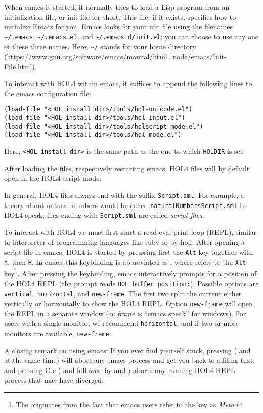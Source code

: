 When emacs is started, it normally tries to load a Lisp program from an
initialization file, or init file for short. This file, if it exists, specifies
how to initialize Emacs for you. Emacs looks for your init file using the
filenames \verb!~/.emacs!, \verb!~/.emacs.el!, and
\verb!~/.emacs.d/init.el!; you can choose to use any one of these three names.
Here, \verb!~/! stands for your home directory
(\url{https://www.gnu.org/software/emacs/manual/html_node/emacs/Init-File.html}).

To interact with HOL4 within emacs, it suffices to append the following lines to
the emacs configuration file:
\begin{lstlisting}
(load-file "<HOL install dir>/tools/hol-unicode.el")
(load-file "<HOL install dir>/tools/hol-input.el")
(load-file "<HOL install dir>/tools/holscript-mode.el")
(load-file "<HOL install dir>/tools/hol-mode.el")
\end{lstlisting}
\noindent Here, \lstinline{<HOL install dir>} is the same path as the one
to which \texttt{HOLDIR} is set.

After loading the files, respectively restarting emacs, HOL4 files will by
default open in the HOL4 script mode.

In general, HOL4 files always end with the suffix \texttt{Script.sml}.
For example, a theory about natural numbers would be called
\texttt{naturalNumbersScript.sml}
In HOL4 speak, files ending with \texttt{Script.sml} are called \emph{script files}.

To interact with HOL4 we must first start a read-eval-print loop (REPL), similar
to interpreter of programming languages like ruby or python.
After opening a script file in emacs, HOL4 is started by presssing
first the \texttt{Alt} key together with \texttt{h}, then \texttt{H}.
In emacs this keybinding is abbreviated as , where  refers
to the \texttt{Alt} key\footnote{The  originates from the fact that
  emacs users refer to the  key as \emph{Meta}.}.
After pressing the keybinding, emacs interactively prompts for a position of
the HOL4 REPL (the prompt reads \lstinline{HOL buffer position:}).
Possible options are \texttt{vertical}, \texttt{horizontal}, and
\texttt{new-frame}.
The first two split the current either vertically or horizontally to show the
HOL4 REPL.
Option \texttt{new-frame} will open the REPL in a separate window (as
\emph{frame} is ``emacs speak'' for windows).
For users with a single monitor, we recommend \texttt{horizontal}, and if two
or more monitors are available, \texttt{new-frame}.

A closing remark on using emacs:
If you ever find yourself stuck, pressing  ( and
 at the same time) will abort any emacs process and get you back to
editing text, and pressing  {C-c} ( and  followed by
 and ) aborts any running HOL4 REPL process that may have
diverged.
